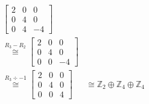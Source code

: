 \begin{align*}
\begin{bmatrix}
        	2 & 0 & 0 \\
        	0 & 4 & 0 \\
        	0 & 4 & -4
        	\end{bmatrix}& \\ \stackrel{R_3 - R_2}{\cong} 
        	\begin{bmatrix}
        	2 & 0 & 0 \\
        	0 & 4 & 0 \\
        	0 & 0 & -4 
        	\end{bmatrix}& \\ \stackrel{R_3\div-1}{\cong} 
        	\begin{bmatrix}
        	2 & 0 & 0 \\
        	0 & 4 & 0 \\
        	0 & 0 & 4
        	\end{bmatrix}& \cong \mathbb{Z}_2\oplus\mathbb{Z}_4\oplus\mathbb{Z}_4
    	\end{align*}
